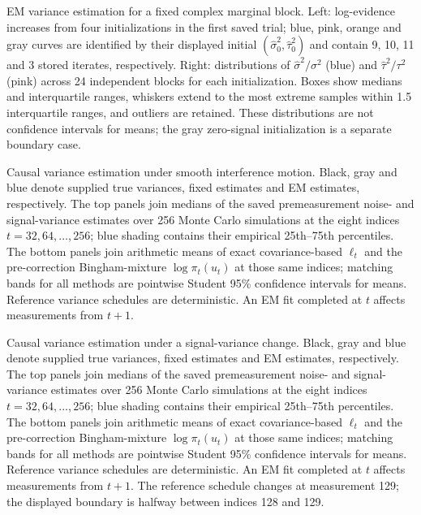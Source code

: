 \caption{EM variance estimation for a fixed complex marginal block. Left: log-evidence increases from four initializations in the first saved trial; blue, pink, orange and gray curves are identified by their displayed initial $(\widehat\sigma_0^2,\widehat\tau_0^2)$ and contain 9, 10, 11 and 3 stored iterates, respectively. Right: distributions of $\widehat\sigma^2/\sigma^2$ (blue) and $\widehat\tau^2/\tau^2$ (pink) across 24 independent blocks for each initialization. Boxes show medians and interquartile ranges, whiskers extend to the most extreme samples within 1.5 interquartile ranges, and outliers are retained. These distributions are not confidence intervals for means; the gray zero-signal initialization is a separate boundary case.}

\caption{Causal variance estimation under smooth interference motion. Black, gray and blue denote supplied true variances, fixed estimates and EM estimates, respectively. The top panels join medians of the saved premeasurement noise- and signal-variance estimates over 256 Monte Carlo simulations at the eight indices $t=32,64,\ldots,256$; blue shading contains their empirical 25th--75th percentiles. The bottom panels join arithmetic means of exact covariance-based $\ell_t$ and the pre-correction Bingham-mixture $\log\pi_t(u_t)$ at those same indices; matching bands for all methods are pointwise Student 95\% confidence intervals for means. Reference variance schedules are deterministic. An EM fit completed at $t$ affects measurements from $t+1$.}

\caption{Causal variance estimation under a signal-variance change. Black, gray and blue denote supplied true variances, fixed estimates and EM estimates, respectively. The top panels join medians of the saved premeasurement noise- and signal-variance estimates over 256 Monte Carlo simulations at the eight indices $t=32,64,\ldots,256$; blue shading contains their empirical 25th--75th percentiles. The bottom panels join arithmetic means of exact covariance-based $\ell_t$ and the pre-correction Bingham-mixture $\log\pi_t(u_t)$ at those same indices; matching bands for all methods are pointwise Student 95\% confidence intervals for means. Reference variance schedules are deterministic. An EM fit completed at $t$ affects measurements from $t+1$. The reference schedule changes at measurement 129; the displayed boundary is halfway between indices 128 and 129.}

